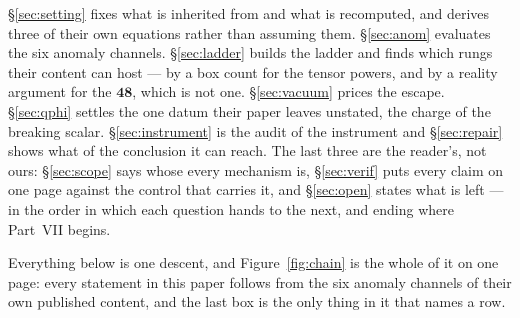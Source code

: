 \documentclass[11pt,a4paper]{article}
\newcommand{\rep}[1]{\mathbf{#1}}
\begin{document}
\S\ref{sec:setting} fixes what is inherited from \cite{KM25} and what is recomputed, and derives three
of their own equations rather than assuming them. \S\ref{sec:anom} evaluates the six anomaly channels.
\S\ref{sec:ladder} builds the ladder and finds which rungs their content can host --- by a box count
for the tensor powers, and by a reality argument for the $\rep{48}$, which is not one.
\S\ref{sec:vacuum} prices the escape. \S\ref{sec:qphi} settles the one datum their paper leaves
unstated, the charge of the breaking scalar. \S\ref{sec:instrument} is the audit of the instrument and
\S\ref{sec:repair} shows what of the conclusion it can reach. The last three are the reader's, not
ours: \S\ref{sec:scope} says whose every mechanism is, \S\ref{sec:verif} puts every claim on one page
against the control that carries it, and \S\ref{sec:open} states what is left --- in the order in
which each question hands to the next, and ending where Part~VII begins.

Everything below is one descent, and Figure~\ref{fig:chain} is the whole of it on one page: every
statement in this paper follows from the six anomaly channels of their own published content, and the
last box is the only thing in it that names a row.
\end{document}
